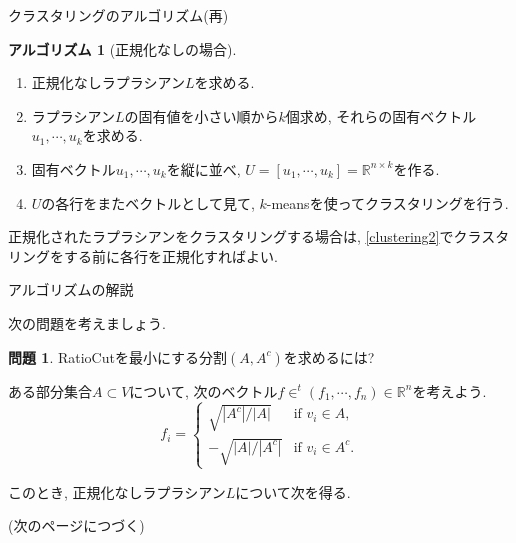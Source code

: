 \documentclass[dvipdfmx,11pt]{beamer}
\theoremstyle{definition}
\newtheorem{alg}{アルゴリズム}
\newtheorem{prob}{問題}
\begin{document}
\begin{frame}{クラスタリングのアルゴリズム(再)}

\begin{alg}[正規化なしの場合] 
\begin{enumerate}
\item 正規化なしラプラシアン$L$を求める.
\item ラプラシアン$L$の固有値を小さい順から$k$個求め, それらの固有ベクトル$u_1,\cdots,u_k$を求める. 
\item 固有ベクトル$u_1,\cdots,u_k$を縦に並べ, $U=[u_1,\cdots,u_k]= \mathbb{R} ^{n \times k}$を作る.
\item\label{clustering2} $U$の各行をまたベクトルとして見て, $k$-meansを使ってクラスタリングを行う.
\end{enumerate}
\end{alg}
正規化されたラプラシアンをクラスタリングする場合は, \ref{clustering2}でクラスタリングをする前に各行を正規化すればよい.

\end{frame}

\begin{frame}{アルゴリズムの解説}

次の問題を考えましょう.
\begin{prob}
RatioCutを最小にする分割$(A, A^c)$を求めるには?
\end{prob}

ある部分集合$A \subset V$について, 次のベクトル$f \in ^{t}(f_1, \cdots, f_n) \in \mathbb{R}^n$を考えよう.
$$f_i =
\begin{cases}
\sqrt{|A^c| / |A|} & \text{if }v_i \in A, \\ 
-\sqrt{|A| / |A^c|} & \text{if } v_i \in A^c .
\end{cases}$$

このとき, 正規化なしラプラシアン$L$について次を得る.

(次のページにつづく)
\end{frame}
\end{document}
